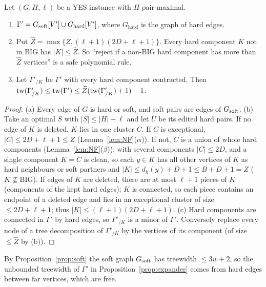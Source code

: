 \begin{proposition}\label{prop:one}
Let $(G,H,\ell)$ be a YES instance with $H$ pair-maximal.
\begin{enumerate}
\item[(a)] $\Gamma'=G_{\mathrm{soft}}[V']\cup G_{\mathrm{hard}}[V']$, where $G_{\mathrm{hard}}$ is the graph of hard edges.
\item[(b)] Put $\widehat Z=\max\{Z,(\ell+1)(2D+\ell+1)\}$. Every hard component $K$ not in $\mathrm{BIG}$ has $|K|\le \widehat Z$. So ``reject if a non-$\mathrm{BIG}$ hard component has more than $\widehat Z$ vertices'' is a safe polynomial rule.
\item[(c)] Let $\Gamma'_{/K}$ be $\Gamma'$ with every hard component contracted. Then $\mathrm{tw}(\Gamma'_{/K})\le\mathrm{tw}(\Gamma')\le \widehat Z(\mathrm{tw}(\Gamma'_{/K})+1)-1$.
\end{enumerate}
\end{proposition}
\begin{proof}
(a) Every edge of $G$ is hard or soft, and soft pairs are edges of $G_{\mathrm{soft}}$. (b) Take an optimal $S$ with $|S|\le|H|+\ell$ and let $U$ be its edited hard pairs. If no edge of $K$ is deleted, $K$ lies in one cluster $C$. If $C$ is exceptional, $|C|\le2D+\ell+1\le Z$ (Lemma~\ref{lem:NF}($\alpha$)). If not, $C$ is a union of whole hard components (Lemma~\ref{lem:NF}($\beta$)); with several components $|C|\le2D$, and a single component $K=C$ is clean, so each $y\in K$ has all other vertices of $K$ as hard neighbours or soft partners and $|K|\le d_h(y)+D+1\le B+D+1=Z$ ($K\not\subseteq\mathrm{BIG}$). If edges of $K$ are deleted, there are at most $\ell+1$ pieces of $K$ (components of the kept hard edges); $K$ is connected, so each piece contains an endpoint of a deleted edge and lies in an exceptional cluster of size $\le2D+\ell+1$; thus $|K|\le(\ell+1)(2D+\ell+1)$. (c) Hard components are connected in $\Gamma'$ by hard edges, so $\Gamma'_{/K}$ is a minor of $\Gamma'$. Conversely replace every node of a tree decomposition of $\Gamma'_{/K}$ by the vertices of its component (of size $\le \widehat Z$ by (b)).
\end{proof}
By Proposition~\ref{prop:soft} the soft graph $G_{\mathrm{soft}}$ has treewidth $\le3w+2$, so the unbounded treewidth of $\Gamma'$ in Proposition~\ref{prop:expander} comes from hard edges between far vertices, which are free.
